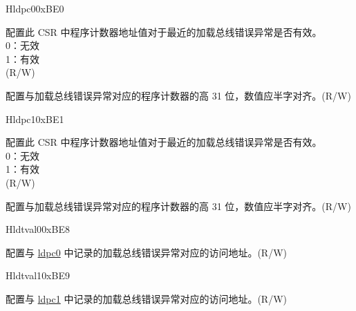 \begin{register}{H}{ldpc0}{0xBE0}\label{regdesc:LDPC0}%
%
%
\regnewline%
\begin{regdesc}\begin{reglist}
\label{fielddesc:LDPC0_VLD}\item [VLD] 配置此 CSR 中程序计数器地址值对于最近的加载总线错误异常是否有效。\\
0：无效\\
1：有效\\
(R/W)
\label{fielddesc:LDPC0_ADDR}\item [ADDR] 配置与加载总线错误异常对应的程序计数器的高 31 位，数值应半字对齐。(R/W)
\end{reglist}\end{regdesc}
\end{register}
\begin{register}{H}{ldpc1}{0xBE1}\label{regdesc:LDPC1}%
%
%
\regnewline%
\begin{regdesc}\begin{reglist}
\label{fielddesc:LDPC1_VLD}\item [VLD]  配置此 CSR 中程序计数器地址值对于最近的加载总线错误异常是否有效。\\
0：无效\\
1：有效\\
(R/W)
\label{fielddesc:LDPC1_ADDR}\item [ADDR] 配置与加载总线错误异常对应的程序计数器的高 31 位，数值应半字对齐。(R/W)
\end{reglist}\end{regdesc}
\end{register}

\begin{register}{H}{ldtval0}{0xBE8}\label{regdesc:LDTVAL0}%
%
\regnewline%
\begin{regdesc}\begin{reglist}
\label{fielddesc:LDTVAL0_ADDR}\item [{ADDR}] 配置与 \hyperref[regdesc:LDPC0]{ldpc0} 中记录的加载总线错误异常对应的访问地址。(R/W)
\end{reglist}\end{regdesc}
\end{register}

\begin{register}{H}{ldtval1}{0xBE9}\label{regdesc:LDTVAL1}%
%
\regnewline%
\begin{regdesc}\begin{reglist}
\label{fielddesc:LDTVAL1_ADDR}\item [{ADDR}] 配置与 \hyperref[regdesc:LDPC1]{ldpc1} 中记录的加载总线错误异常对应的访问地址。(R/W)
\end{reglist}\end{regdesc}
\end{register}

